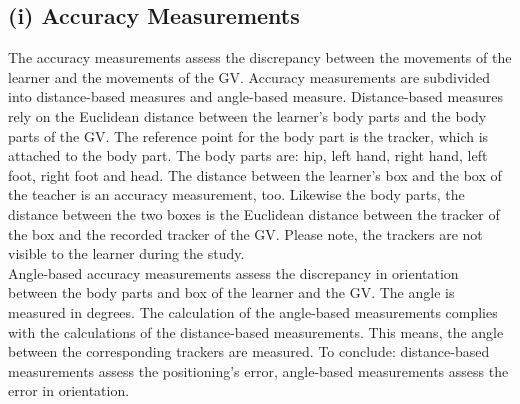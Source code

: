 \subsection{(i) Accuracy Measurements}
The accuracy measurements assess the discrepancy between the movements of the learner and the movements of the GV. Accuracy measurements are subdivided into distance-based measures and angle-based measure. Distance-based measures rely on the Euclidean distance between the learner's body parts and the body parts of the GV. The reference point for the body part is the tracker, which is attached to the body part. The body parts are: hip, left hand, right hand, left foot, right foot and head. The distance between the learner's box and the box of the teacher is an accuracy measurement, too. Likewise the body parts, the distance between the two boxes is the Euclidean distance between the tracker of the box and the recorded tracker of the GV. Please note, the trackers are not visible to the learner during the study.\\
Angle-based accuracy measurements assess the discrepancy in orientation between the body parts and box of the learner and the GV. The angle is measured in degrees. The calculation of the angle-based measurements complies with the calculations of the distance-based measurements. This means, the angle between the corresponding trackers are measured. To conclude: distance-based measurements assess the positioning's error, angle-based measurements assess the error in orientation.

